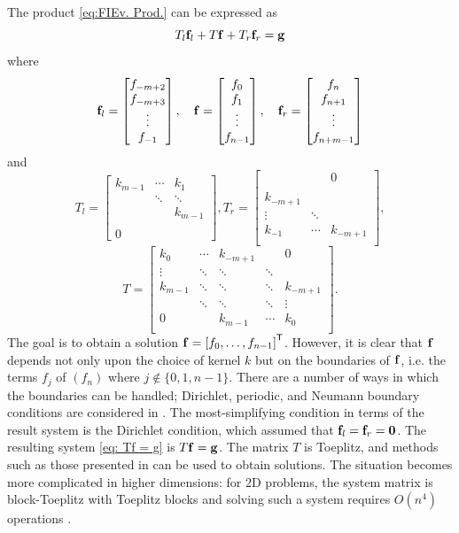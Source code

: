 The product \eqref{eq:FIEv. Prod.} can be expressed as
\begin{equation}
\label{eq: Tf = g}
T_{l}\mathbf{f}_{l} + T\mathbf{f} + T_{r}\mathbf{f}_{r} = \mathbf{g}
\end{equation}
where
\[\mathbf{f}_{l} = \begin{bmatrix}
f_{-m+2} \\
f_{-m+3} \\
\vdots \\
f_{-1}
\end{bmatrix}, \quad \mathbf{f} = \begin{bmatrix}
f_{0} \\
f_{1} \\
\vdots \\
f_{n-1}
\end{bmatrix}, \quad \mathbf{f}_{r} = \begin{bmatrix}
f_{n} \\
f_{n+1} \\
\vdots \\
f_{n+m-1}
\end{bmatrix}\]
and
\[T_{l} = \begin{bmatrix}
k_{m-1} & \cdots & k_{1} \\
 & \ddots & \ddots \\
 & & k_{m-1} \\
 & & \\
0 & & 
\end{bmatrix},
T_{r} = \begin{bmatrix}
 & & 0 \\
 & & \\
k_{-m+1} & & \\
\vdots & \ddots &  \\
k_{-1} & \cdots & k_{-m+1} \\
\end{bmatrix},\]
\[T = \begin{bmatrix}
k_{0} & \cdots & k_{-m+1} & & 0 \\
\vdots & \ddots & \ddots & \ddots &  \\
k_{m-1} & \ddots & \ddots & \ddots & k_{-m+1} \\
 & \ddots & \ddots & \ddots & \vdots \\
0 & & k_{m-1} & \cdots & k_{0} \\
\end{bmatrix}.\]
The goal is to obtain a solution $\mathbf{f} = {[f_0,\ldots,f_{n-1}]}^\mathsf{T}$. However, it is clear that $\mathbf{f}$ depends not only upon the choice of kernel $k$ but on the boundaries of $\mathbf{f}$, i.e. the terms $f_j$ of $(f_n)$ where $j \not\in \{0,1,n-1\}$. There are a number of ways in which the boundaries can be handled; Dirichlet, periodic, and Neumann boundary conditions are considered in \cite{NeumannDCT}. The most-simplifying condition in terms of the result system is the Dirichlet condition, which assumed that $\mathbf{f}_l = \mathbf{f}_r = \boldsymbol{0}$. The resulting system \eqref{eq: Tf = g} is $T\mathbf{f} = \mathbf{g}$. The matrix $T$ is Toeplitz, and methods such as those presented in \cite{Vogel:2002} can be used to obtain solutions. The situation becomes more complicated in higher dimensions: for 2D problems, the system matrix is block-Toeplitz with Toeplitz blocks and solving such a system requires $O(n^4)$ operations \cite{KalouptsidisCarayannisManolakis}. \par 
